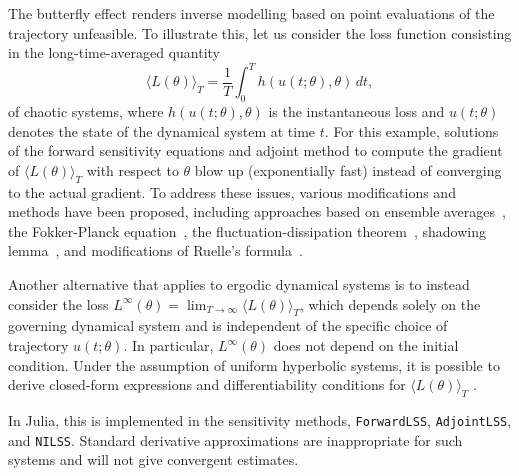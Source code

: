 The butterfly effect renders inverse modelling based on point evaluations of the trajectory unfeasible. 
To illustrate this, let us consider the loss function consisting in the long-time-averaged quantity 
\begin{equation}\label{eq:long_time_averaged_quantities}
    \langle L(\theta) \rangle_T = \frac{1}{T} \int_0^T h(u(t; \theta), \theta) \, dt, 
\end{equation}
of chaotic systems, where $h(u(t; \theta), \theta)$ is the instantaneous loss and $u(t; \theta)$ denotes the state of the dynamical system at time $t$.
For this example, solutions of the forward sensitivity equations and adjoint method to compute the gradient of $\langle L(\theta) \rangle_T$ with respect to $\theta$ blow up (exponentially fast) instead of converging to the actual gradient.
To address these issues, various modifications and methods have been proposed, including approaches based on ensemble averages~\cite{lea2000sensitivity, eyink2004ruelle}, the Fokker-Planck equation~\cite{thuburn2005climate, blonigan2014probability}, the fluctuation-dissipation theorem~\cite{leith1975climate, abramov2007blended, abramov2008new}, shadowing lemma~\cite{wang2013forward, wang2014least, wang2014convergence, ni2017sensitivity, blonigan2017adjoint, blonigan2018multiple, ni2019adjoint, ni2019sensitivity}, and modifications of Ruelle's formula~\cite{chandramoorthy2022efficient, ni2020fast}.

Another alternative that applies to ergodic dynamical systems is to instead consider the loss $L^\infty(\theta) = \lim_{T\to\infty} \langle L(\theta) \rangle_T$, which depends solely on the governing dynamical system and is independent of the specific choice of trajectory $u(t; \theta)$. 
In particular, $L^\infty(\theta)$ does not depend on the initial condition. 
Under the assumption of uniform hyperbolic systems, it is possible to derive closed-form expressions and differentiability conditions for $ \langle L(\theta) \rangle_T$ \cite{ruelle1997differentiation,ruelle2009review}.

In Julia, this is implemented in the sensitivity methods, \texttt{ForwardLSS},  \texttt{AdjointLSS}, and \texttt{NILSS}. %
Standard derivative approximations are inappropriate for such systems and will not give convergent estimates.
